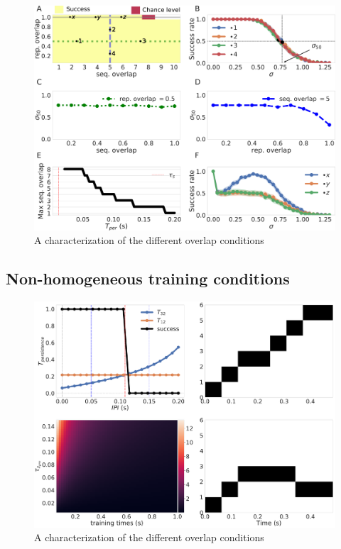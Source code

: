 \documentclass[10pt,a4paper]{article}
\begin{document}
\begin{figure}[H]
\centering
\includegraphics[scale=0.20]{representations.pdf}
\caption{A characterization of the different overlap conditions}
\label{fig:representations}
\end{figure}


\subsection{Non-homogeneous training conditions}

\begin{figure}[H]
\centering
\includegraphics[scale=0.20]{ipi_non_homogenous.pdf}
\caption{A characterization of the different overlap conditions}
\label{fig:non-homo}
\end{figure}


%
%
\end{document}
